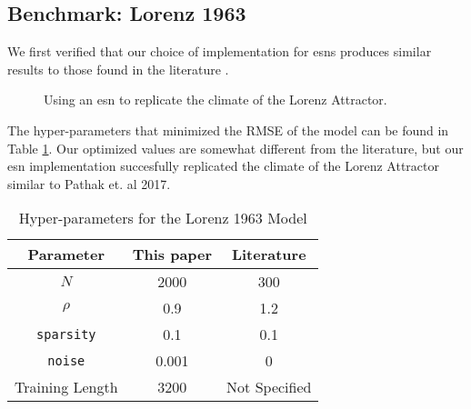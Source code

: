 \subsection{Benchmark: Lorenz 1963}

We first verified that our choice of implementation for \glspl{esn}
produces similar results to those found in the literature \cite{pathak_using_2017}.
\begin{figure*}[h]
  
  \caption{Using an \gls{esn} to replicate the climate of the Lorenz Attractor.}
  \label{fig:lorenz63}
\end{figure*}
The hyper-parameters that minimized the RMSE of the model can be found in Table
\ref{tab:lorenzparam}. Our optimized values are somewhat different from the literature, but our \gls{esn} implementation succesfully
replicated the climate of the Lorenz Attractor similar to Pathak et. al 2017.
\begin{table}[h]
  \centering
  \caption{Hyper-parameters for the Lorenz 1963 Model}
  \label{tab:lorenzparam}
  \begin{tabular}{c|c|c}
    \hline
    Parameter & This paper & Literature \cite{pathak_using_2017}\\
    \hline
    $N$ & 2000& 300\\
    $\rho$& 0.9&1.2\\
    \texttt{sparsity}& 0.1& 0.1\\
    \texttt{noise}& 0.001& 0\\
    Training Length & 3200& Not Specified\\
  \end{tabular}
\end{table}
